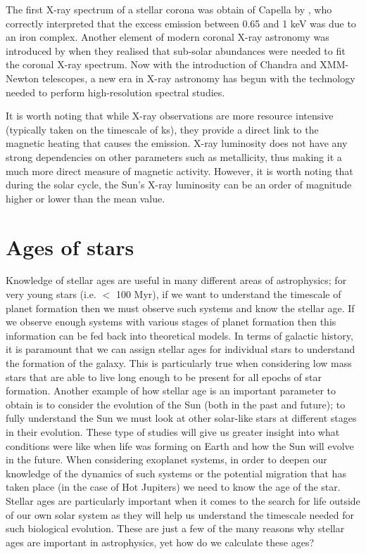 The first X-ray spectrum of a stellar corona was obtain of Capella by \citet{Cash_etal_1978}, who correctly interpreted that the excess emission between 0.65 and 1 keV was due to an iron complex. Another element of modern coronal X-ray astronomy was introduced by \citet{Walter_etal_1978} when they realised that sub-solar abundances were needed to fit the coronal X-ray spectrum. Now with the introduction of Chandra and XMM-Newton telescopes, a new era in X-ray astronomy has begun with the technology needed to perform high-resolution spectral studies.

It is worth noting that while X-ray observations are more resource intensive (typically taken on the timescale of ks), they provide a direct link to the magnetic heating that causes the emission. X-ray luminosity does not have any strong dependencies on other parameters such as metallicity, thus making it a much more direct measure of magnetic activity. However, it is worth noting that during the solar cycle, the Sun's X-ray luminosity can be an order of magnitude higher or lower than the mean value.


\section{Ages of stars}
\label{Section:intro_ages}
Knowledge of stellar ages are useful in many different areas of astrophysics; for very young stars (i.e. $<$ 100 Myr), if we want to understand the timescale of planet formation then we must observe such systems and know the stellar age. If we observe enough systems with various stages of planet formation then this information can be fed back into theoretical models. In terms of galactic history, it is paramount that we can assign stellar ages for individual stars to understand the formation of the galaxy. This is particularly true when considering low mass stars that are able to live long enough to be present for all epochs of star formation. Another example of how stellar age is an important parameter to obtain is to consider the evolution of the Sun (both in the past and future); to fully understand the Sun we must look at other solar-like stars at different stages in their evolution. These type of studies will give us greater insight into what conditions were like when life was forming on Earth and how the Sun will evolve in the future. When considering exoplanet systems, in order to deepen our knowledge of the dynamics of such systems or the potential migration that has taken place (in the case of Hot Jupiters) we need to know the age of the star. Stellar ages are particularly important when it comes to the search for life outside of our own solar system as they will help us understand the timescale needed for such biological evolution. These are just a few of the many reasons why stellar ages are important in astrophysics, yet how do we calculate these ages?

